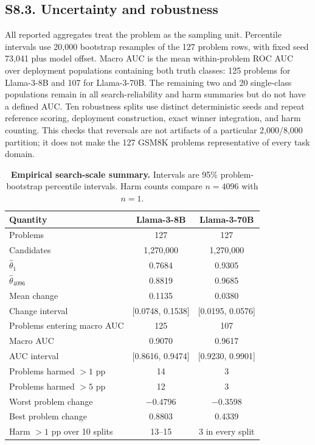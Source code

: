 \subsection*{S8.3. Uncertainty and robustness}

All reported aggregates treat the problem as the sampling unit. Percentile intervals use 20,000 bootstrap resamples of the 127 problem rows, with fixed seed 73,041 plus model offset. Macro AUC is the mean within-problem ROC AUC over deployment populations containing both truth classes: 125 problems for Llama-3-8B and 107 for Llama-3-70B. The remaining two and 20 single-class populations remain in all search-reliability and harm summaries but do not have a defined AUC. Ten robustness splits use distinct deterministic seeds and repeat reference scoring, deployment construction, exact winner integration, and harm counting. This checks that reversals are not artifacts of a particular 2,000/8,000 partition; it does not make the 127 GSM8K problems representative of every task domain.

\begin{table}[h]
\centering
\caption{\textbf{Empirical search-scale summary.} Intervals are 95\% problem-bootstrap percentile intervals. Harm counts compare $n=4096$ with $n=1$.}
\label{si:tab:empirical-summary}
\begin{tabular}{lcc}
\toprule
Quantity & Llama-3-8B & Llama-3-70B \\
\midrule
Problems & 127 & 127 \\
Candidates & 1,270,000 & 1,270,000 \\
$\widehat\theta_1$ & 0.7684 & 0.9305 \\
$\widehat\theta_{4096}$ & 0.8819 & 0.9685 \\
Mean change & 0.1135 & 0.0380 \\
Change interval & [0.0748, 0.1538] & [0.0195, 0.0576] \\
Problems entering macro AUC & 125 & 107 \\
Macro AUC & 0.9070 & 0.9617 \\
AUC interval & [0.8616, 0.9474] & [0.9230, 0.9901] \\
Problems harmed $>1$ pp & 14 & 3 \\
Problems harmed $>5$ pp & 12 & 3 \\
Worst problem change & $-0.4796$ & $-0.3598$ \\
Best problem change & 0.8803 & 0.4339 \\
Harm $>1$ pp over 10 splits & 13--15 & 3 in every split \\
\bottomrule
\end{tabular}
\end{table}

